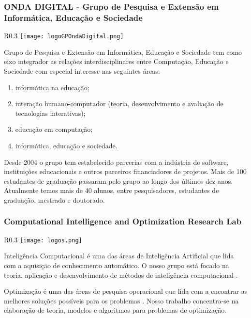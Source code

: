 \subsubsection{ONDA DIGITAL - Grupo de Pesquisa e Extensão em Informática, Educação e Sociedade}
\begin{wrapfigure}{R}{0.3\textwidth}
            \centering
            \texttt{[image: logoGPOndaDigital.png]}
        \end{wrapfigure}
Grupo de Pesquisa e Extensão em Informática, Educação e Sociedade tem como eixo integrador as relações interdisciplinares entre Computação, Educação e Sociedade com especial interesse nas seguintes áreas: 
\begin{enumerate}
\item informática na educação; 
\item  interação humano-computador (teoria, desenvolvimento e avaliação de tecnologias interativas); 
\item educação em computação; 
\item informática, educação e sociedade.
\end{enumerate}

Desde 2004 o grupo tem estabelecido parcerias com a indústria de software, instituições educacionais e outros parceiros financiadores de projetos. Mais de 100 estudantes de graduação passaram pelo grupo ao longo dos últimos dez anos. Atualmente temos mais de 40 alunos, entre pesquisadores, estudantes de graduação, mestrado e doutorado.

\subsubsection{Computational Intelligence and Optimization Research Lab}
\begin{wrapfigure}{R}{0.3\textwidth}
            \centering
            \texttt{[image: logos.png]}
        \end{wrapfigure}
Inteligência Computacional é uma das áreas de Inteligência Artificial que lida com a aquisição de conhecimento automático. O nosso grupo está focado na teoria, aplicação e desenvolvimento de métodos de inteligência computacional .
	  
	  Optimização é uma das áreas de pesquisa operacional que lida com a encontrar as melhores soluções possíveis para os problemas . Nosso trabalho concentra-se na elaboração de teoria, modelos e algoritmos para problemas de optimização.
